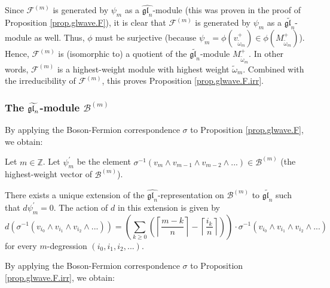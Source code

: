 \documentclass[etingof-lie.tex]{subfiles}
\begin{document}
Since $\mathcal{F}^{\left(  m\right)  }$ is generated by $\psi_{m}$ as a
$\widehat{\mathfrak{gl}_{n}}$-module (this was proven in the proof of
Proposition \ref{prop.glwave.F}), it is clear that $\mathcal{F}^{\left(
m\right)  }$ is generated by $\psi_{m}$ as a $\widetilde{\mathfrak{gl}_{n}}%
$-module as well. Thus, $\phi$ must be surjective (because $\psi_{m}%
=\phi\left(  v_{\widetilde{\omega}_{m}}^{+}\right)  \in\phi\left(
M_{\widetilde{\omega}_{m}}^{+}\right)  $). Hence, $\mathcal{F}^{\left(
m\right)  }$ is (isomorphic to) a quotient of the $\widetilde{\mathfrak{gl}%
_{n}}$-module $M_{\widetilde{\omega}_{m}}^{+}$. In other words, $\mathcal{F}%
^{\left(  m\right)  }$ is a highest-weight module with highest weight
$\widetilde{\omega}_{m}$. Combined with the irreducibility of $\mathcal{F}%
^{\left(  m\right)  }$, this proves Proposition \ref{prop.glwave.F.irr}.

\subsubsection{The
\texorpdfstring{$\protect\widetilde{\mathfrak{gl}_{n}}$}{gl-n-tilde}-module
\texorpdfstring{$\mathcal{B}^{\left(  m\right)  }$}{structure on the bosonic
Fock space}}

By applying the Boson-Fermion correspondence $\sigma$ to Proposition
\ref{prop.glwave.F}, we obtain:

\begin{proposition}
\label{prop.glwave.B}Let $m\in\mathbb{Z}$. Let $\psi_{m}^{\prime}$ be the
element $\sigma^{-1}\left(  v_{m}\wedge v_{m-1}\wedge v_{m-2}\wedge...\right)
\in\mathcal{B}^{\left(  m\right)  }$ (the highest-weight vector of
$\mathcal{B}^{\left(  m\right)  }$).

There exists a unique extension of the $\widehat{\mathfrak{gl}_{n}}%
$-representation on $\mathcal{B}^{\left(  m\right)  }$ to
$\widetilde{\mathfrak{gl}_{n}}$ such that $d\psi_{m}^{\prime}=0$. The action
of $d$ in this extension is given by%
\[
d\left(  \sigma^{-1}\left(  v_{i_{0}}\wedge v_{i_{1}}\wedge v_{i_{2}}%
\wedge...\right)  \right)  =\left(  \sum\limits_{k\geq0}\left(  \left\lceil
\dfrac{m-k}{n}\right\rceil -\left\lceil \dfrac{i_{k}}{n}\right\rceil \right)
\right)  \cdot\sigma^{-1}\left(  v_{i_{0}}\wedge v_{i_{1}}\wedge v_{i_{2}%
}\wedge...\right)
\]
for every $m$-degression $\left(  i_{0},i_{1},i_{2},...\right)  $.
\end{proposition}

By applying the Boson-Fermion correspondence $\sigma$ to Proposition
\ref{prop.glwave.F.irr}, we obtain:
\end{document}
